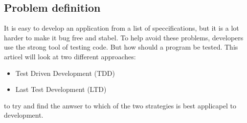 \subsection{Problem definition}
\label{section:problem}
It is easy to develop an application from a list of speccifications, but it is a lot harder to make it bug free and stabel. To help avoid these problems, developers use the strong tool of testing code. But how should a program be tested. This articel will look at two different approaches:
\begin{itemize}
\item Test Driven Development (TDD)
\item Last Test Development (LTD) 
\end{itemize}
to try and find the anwser to which of the two strategies is best applicapel to development.









